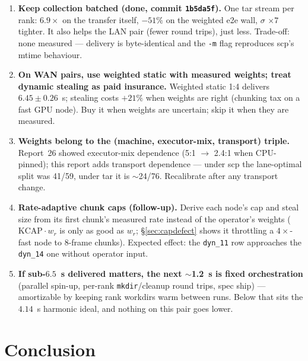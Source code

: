 \documentclass[
	english,
	letterpaper, oneside
]{article}
\begin{document}
\begin{enumerate}
  \item \textbf{Keep collection batched (done, commit \texttt{1b5da5f}).}
        One tar stream per rank: $6.9\times$ on the transfer itself,
        $-51\%$ on the weighted e2e wall, $\sigma$ $\times7$ tighter.
        It also helps the LAN pair (fewer round trips), just less.
        Trade-off: none measured --- delivery is byte-identical and the
        \texttt{-m} flag reproduces scp's mtime behaviour.
  \item \textbf{On WAN pairs, use weighted static with measured
        weights; treat dynamic stealing as paid insurance.} Weighted
        static 1:4 delivers $6.45\pm0.26$~s; stealing costs $+21\%$ when
        weights are right (chunking tax on a fast GPU node). Buy it when
        weights are uncertain; skip it when they are measured.
  \item \textbf{Weights belong to the (machine, executor-mix,
        transport) triple.} Report~26 showed executor-mix dependence
        (5:1 $\to$ 2.4:1 when CPU-pinned); this report adds transport
        dependence --- under scp the lane-optimal split was 41/59, under
        tar it is $\sim$24/76. Recalibrate after any transport change.
  \item \textbf{Rate-adaptive chunk caps (follow-up).} Derive each
        node's cap and steal size from its first chunk's measured rate
        instead of the operator's weights ($\mathrm{KCAP}\cdot w_r$ is
        only as good as $w_r$; \S\ref{sec:capdefect} shows it throttling
        a $4\times$-fast node to 8-frame chunks). Expected effect: the
        \texttt{dyn\_11} row approaches the \texttt{dyn\_14} one without
        operator input.
  \item \textbf{If sub-$6.5$~s delivered matters, the next $\sim$1.2~s
        is fixed orchestration} (parallel spin-up, per-rank
        \texttt{mkdir}/cleanup round trips, spec ship) --- amortizable
        by keeping rank workdirs warm between runs. Below that sits the
        $4.14$~s harmonic ideal, and nothing on this pair goes lower.
\end{enumerate}

\section{Conclusion}
\label{sec:conclusion}
\end{document}
